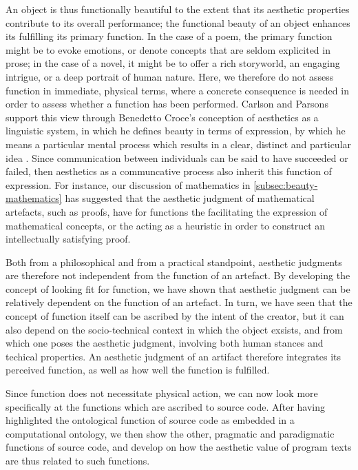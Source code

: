 An object is thus functionally beautiful to the extent that its aesthetic properties contribute to its overall performance; the functional beauty of an object enhances its fulfilling its primary function. In the case of a poem, the primary function might be to evoke emotions, or denote concepts that are seldom explicited in prose; in the case of a novel, it might be to offer a rich storyworld, an engaging intrigue, or a deep portrait of human nature. Here, we therefore do not assess function in immediate, physical terms, where a concrete consequence is needed in order to assess whether a function has been performed. Carlson and Parsons support this view through Benedetto Croce's conception of aesthetics as a linguistic system, in which he defines beauty in terms of expression, by which he means a particular mental process which results in a clear, distinct and particular idea \citep{parsons_functional_2012}. Since communication between individuals can be said to have succeeded or failed, then aesthetics as a communcative process also inherit this function of expression. For instance, our discussion of mathematics in \autoref{subsec:beauty-mathematics} has suggested that the aesthetic judgment of mathematical artefacts, such as proofs, have for functions the facilitating the expression of mathematical concepts, or the acting as a heuristic in order to construct an intellectually satisfying proof. 

Both from a philosophical and from a practical standpoint, aesthetic judgments are therefore not independent from the function of an artefact. By developing the concept of looking fit for function, we have shown that aesthetic judgment can be relatively dependent on the function of an artefact. In turn, we have seen that the concept of function itself can be ascribed by the intent of the creator, but it can also depend on the socio-technical context in which the object exsists, and from which one poses the aesthetic judgment, involving both human stances and techical properties. An aesthetic judgment of an artifact therefore integrates its perceived function, as well as how well the function is fulfilled. 

Since function does not necessitate physical action, we can now look more specifically at the functions which are ascribed to source code. After having highlighted the ontological function of source code as embedded in a computational ontology, we then show the other, pragmatic and paradigmatic functions of source code, and develop on how the aesthetic value of program texts are thus related to such functions.


